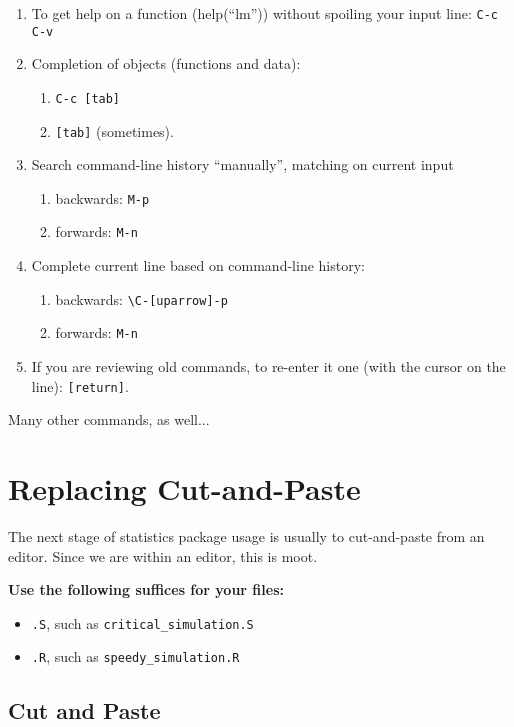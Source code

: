 \documentclass{article}
\begin{document}
\begin{enumerate}
\item To get help on a function (help(``lm'')) without spoiling your
  input line: \verb+C-c C-v+
\item Completion of objects (functions and data): 
  \begin{enumerate}
  \item \verb+C-c [tab]+ 
  \item \verb+[tab]+ (sometimes).
\end{enumerate}
\item Search command-line history ``manually'', matching on current input
  \begin{enumerate}
  \item backwards: \verb+M-p+
  \item forwards:  \verb+M-n+
  \end{enumerate}
\item Complete current line based on command-line history:
  \begin{enumerate}
  \item backwards: \verb+\C-[uparrow]-p+
  \item forwards:  \verb+M-n+
  \end{enumerate}
\item If you are reviewing old commands, to re-enter it one (with the
  cursor on the line): \verb+[return]+.  
\end{enumerate}

Many other commands, as well...

\section{Replacing Cut-and-Paste}
\label{sec:cutpaste}

The next stage of statistics package usage is usually to cut-and-paste
from an editor.  Since we are within an editor, this is moot.

\textbf{Use the following suffices for your files:}
\begin{itemize}
\item \verb+.S+, such as \verb+critical_simulation.S+
\item \verb+.R+, such as \verb+speedy_simulation.R+
\end{itemize}

\subsection{Cut and Paste}
\label{sec:cutpaste:usual}
\end{document}
